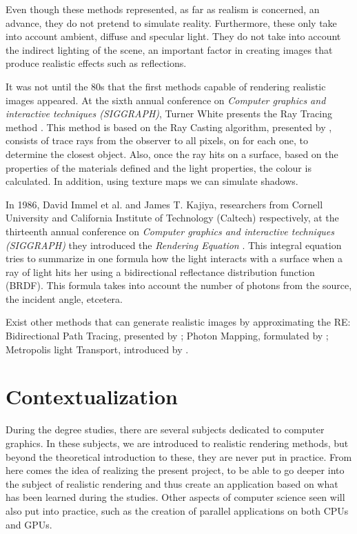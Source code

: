 \documentclass[titlepage,12pt]{article}
\begin{document}
Even though these methods represented, as far as realism is concerned, an advance, they do not pretend to simulate reality. Furthermore, these only take into account ambient, diffuse and specular light. They do not take into account the indirect lighting of the scene, an important factor in creating images that produce realistic effects such as reflections.

It was not until the 80s that the first methods capable of rendering realistic images appeared. At the sixth annual conference on \textit{Computer graphics and interactive techniques (SIGGRAPH)}, Turner White presents the Ray Tracing method \citep{Whitted1980}. This method is based on the Ray Casting algorithm, presented by \citep{Appel1968}, consists of trace rays from the observer to all pixels, on for each one, to determine the closest object. Also, once the ray hits on a surface, based on the properties of the materials defined and the light properties, the colour is calculated. In addition, using texture maps we can simulate shadows.

In 1986, David Immel et al. and James T. Kajiya, researchers from Cornell University and California Institute of Technology (Caltech) respectively, at the thirteenth annual conference on \textit{Computer graphics and interactive techniques (SIGGRAPH)} they introduced the \textit{Rendering Equation} \citep{Kajiya1986, Immel1986}. This integral equation tries to summarize in one formula how the light interacts with a surface when a ray of light hits her using a bidirectional reflectance distribution function (BRDF). This formula takes into account the number of photons from the source, the incident angle, etcetera.

Exist other methods that can generate realistic images by approximating the RE: Bidirectional Path Tracing, presented by \citep{Lafortune1993}; Photon Mapping, formulated by \citep{Jensen1996}; Metropolis light Transport, introduced by \citep{Veach1997}.

\newpage

\section{Contextualization}

During the degree studies, there are several subjects dedicated to computer graphics. In these subjects, we are introduced to realistic rendering methods, but beyond the theoretical introduction to these, they are never put in practice. From here comes the idea of realizing the present project, to be able to go deeper into the subject of realistic rendering and thus create an application based on what has been learned during the studies. Other aspects of computer science seen will also put into practice, such as the creation of parallel applications on both CPUs and GPUs.
\end{document}
